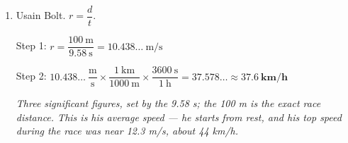\documentclass[12pt, twoside]{article}
\begin{document}
\begin{enumerate}[itemsep=0.4cm]
  Step 1: \quad quantity $= r \cdot t = 2.2~\dfrac{\text{gal}}{\text{min}} \times
  0.75~\text{min} = 1.65~\text{gal}$

  Step 2: \quad $1.65~\text{gal} \times \dfrac{3.785~\text{L}}{1~\text{gal}}
  = 6.24525~\text{L} \approx \mathbf{6.2~\textbf{L}}$

  \emph{Two significant figures: both 2.2 gal/min and 45 s have two. Accept a solution
  that converts the rate to gal/s instead (2.2 gal/min $= 0.0366\ldots$ gal/s); the
  answer is the same.}

\item Usain Bolt. \quad $r = \dfrac{d}{t}$.

  Step 1: \quad $r = \dfrac{100~\text{m}}{9.58~\text{s}} = 10.438\ldots~\text{m/s}$

  Step 2: \quad $10.438\ldots~\dfrac{\text{m}}{\text{s}} \times
  \dfrac{1~\text{km}}{1000~\text{m}} \times \dfrac{3600~\text{s}}{1~\text{h}}
  = 37.578\ldots \approx \mathbf{37.6~\textbf{km/h}}$

  \emph{Three significant figures, set by the 9.58 s; the 100 m is the exact race
  distance. This is his average speed --- he starts from rest, and his top speed
  during the race was near 12.3 m/s, about 44 km/h.}

\end{enumerate}
\end{document}
